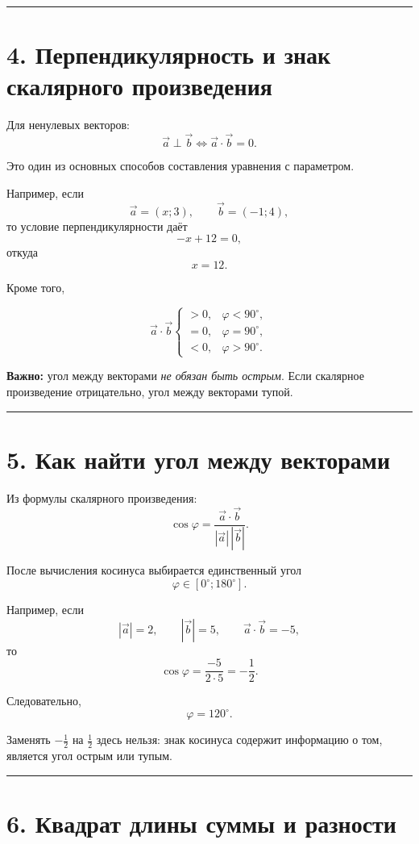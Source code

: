 \documentclass[a4paper,12pt]{article}
\newcommand{\vct}[1]{\vec{#1}}
\newcommand{\sectionline}{%
    \par\noindent
    {\color{linegray}\rule{\linewidth}{0.5pt}}
    \par
}
\begin{document}
\sectionline

\section*{\color{darkaccent}4. Перпендикулярность и знак скалярного произведения}

Для ненулевых векторов:
\[
\boxed{
\vct a\perp\vct b
\iff
\vct a\cdot\vct b=0
}.
\]

Это один из основных способов составления уравнения с параметром.

Например, если
\[
\vct a=(x;3),
\qquad
\vct b=(-1;4),
\]
то условие перпендикулярности даёт
\[
-x+12=0,
\]
откуда
\[
x=12.
\]

Кроме того,

\[
\vct a\cdot\vct b
\begin{cases}
>0, & \varphi<90^\circ,\\
=0, & \varphi=90^\circ,\\
<0, & \varphi>90^\circ.
\end{cases}
\]

\textbf{Важно:}
угол между векторами \emph{не обязан быть острым}.
Если скалярное произведение отрицательно, угол между векторами тупой.

\sectionline

\section*{\color{darkaccent}5. Как найти угол между векторами}

Из формулы скалярного произведения:
\[
\boxed{
\cos\varphi
=
\frac{\vct a\cdot\vct b}
{|\vct a|\,|\vct b|}
}.
\]

После вычисления косинуса выбирается единственный угол
\[
\varphi\in[0^\circ;180^\circ].
\]

Например, если
\[
|\vct a|=2,
\qquad
|\vct b|=5,
\qquad
\vct a\cdot\vct b=-5,
\]
то
\[
\cos\varphi
=
\frac{-5}{2\cdot5}
=
-\frac12.
\]

Следовательно,
\[
\boxed{\varphi=120^\circ}.
\]

Заменять $-\frac12$ на $\frac12$ здесь нельзя:
знак косинуса содержит информацию о том, является угол острым или тупым.

\sectionline

\section*{\color{darkaccent}6. Квадрат длины суммы и разности}
\end{document}
